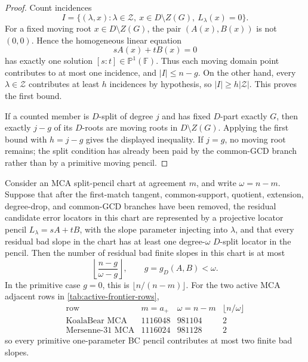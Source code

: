 \documentclass[11pt,a4paper]{amsart}
\numberwithin{equation}{section}
\theoremstyle{remark}
\newcommand{\F}{\mathbb F}\newcommand{\B}{\mathbb B}\newcommand{\K}{\mathbb K}\newcommand{\Z}{\mathbb Z}
\begin{document}
\begin{proof}
Count incidences
\[
        I=\{(\lambda,x):\lambda\in\mathcal Z,
        \ x\in D\setminus Z(G),\ L_\lambda(x)=0\}.
\]
For a fixed moving root \(x\in D\setminus Z(G)\), the pair \((A(x),B(x))\) is not \((0,0)\).  Hence the homogeneous linear equation
\[
        sA(x)+tB(x)=0
\]
has exactly one solution \([s:t]\in\mathbb P^1(\F)\).  Thus each moving domain point contributes to at most one incidence, and \(|I|\le n-g\).  On the other hand, every \(\lambda\in\mathcal Z\) contributes at least \(h\) incidences by hypothesis, so \(|I|\ge h|\mathcal Z|\).  This proves the first bound.

If a counted member is \(D\)-split of degree \(j\) and has fixed \(D\)-part exactly \(G\), then exactly \(j-g\) of its \(D\)-roots are moving roots in \(D\setminus Z(G)\).  Applying the first bound with \(h=j-g\) gives the displayed inequality.  If \(j=g\), no moving root remains; the split condition has already been paid by the common-GCD branch rather than by a primitive moving pencil.
\end{proof}

\begin{corollary}\label{cor:bc-one-pencil}
Consider an MCA split-pencil chart at agreement \(m\), and write \(\omega=n-m\).  Suppose that after the first-match tangent, common-support, quotient, extension, degree-drop, and common-GCD branches have been removed, the residual candidate error locators in this chart are represented by a projective locator pencil \(L_\lambda=sA+tB\), with the slope parameter injecting into \(\lambda\), and that every residual bad slope in the chart has at least one degree-\(\omega\) \(D\)-split locator in the pencil.  Then the number of residual bad finite slopes in this chart is at most
\[
        \left\lfloor\frac{n-g}{\omega-g}\right\rfloor,
        \qquad g=g_D(A,B)<\omega .
\]
In the primitive case \(g=0\), this is \(\lfloor n/(n-m)\rfloor\).  For the two active MCA adjacent rows in \cref{tab:active-frontier-rows},
\[
\begin{array}{c|c|c|c}
\text{row} & m=a_+ & \omega=n-m & \lfloor n/\omega\rfloor\\ \hline
\text{KoalaBear MCA} & 1116048 & 981104 & 2\\
\text{Mersenne-31 MCA} & 1116024 & 981128 & 2
\end{array}
\]
so every primitive one-parameter BC pencil contributes at most two finite bad slopes.
\end{corollary}
\end{document}
